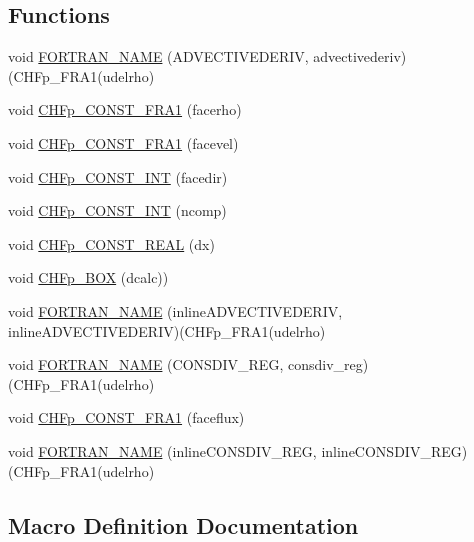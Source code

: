 \subsection*{Functions}
\begin{DoxyCompactItemize}
\item 
void \hyperlink{cdr__solverF__F_8H_a6eee6b82c47317a482ecaaf9adedaf5f}{F\+O\+R\+T\+R\+A\+N\+\_\+\+N\+A\+ME} (A\+D\+V\+E\+C\+T\+I\+V\+E\+D\+E\+R\+IV, advectivederiv)(C\+H\+Fp\+\_\+\+F\+R\+A1(udelrho)
\item 
void \hyperlink{cdr__solverF__F_8H_aed6771007b9e1bee1ab1c05052840f0c}{C\+H\+Fp\+\_\+\+C\+O\+N\+S\+T\+\_\+\+F\+R\+A1} (facerho)
\item 
void \hyperlink{cdr__solverF__F_8H_a318274d3849ac8a171a91e4015a86b8f}{C\+H\+Fp\+\_\+\+C\+O\+N\+S\+T\+\_\+\+F\+R\+A1} (facevel)
\item 
void \hyperlink{cdr__solverF__F_8H_ae815582b84a8a494b7fcb6adbcb99eac}{C\+H\+Fp\+\_\+\+C\+O\+N\+S\+T\+\_\+\+I\+NT} (facedir)
\item 
void \hyperlink{cdr__solverF__F_8H_af5e2bb529292ffeee778ec16883ab173}{C\+H\+Fp\+\_\+\+C\+O\+N\+S\+T\+\_\+\+I\+NT} (ncomp)
\item 
void \hyperlink{cdr__solverF__F_8H_aab9e0951392a8388d9b94d058e47a98c}{C\+H\+Fp\+\_\+\+C\+O\+N\+S\+T\+\_\+\+R\+E\+AL} (dx)
\item 
void \hyperlink{cdr__solverF__F_8H_a72ca9a76864b425a8bc56c7b7d4e1f01}{C\+H\+Fp\+\_\+\+B\+OX} (dcalc))
\item 
void \hyperlink{cdr__solverF__F_8H_a382568d0ec3df87a8c3883f57f21c538}{F\+O\+R\+T\+R\+A\+N\+\_\+\+N\+A\+ME} (inline\+A\+D\+V\+E\+C\+T\+I\+V\+E\+D\+E\+R\+IV, inline\+A\+D\+V\+E\+C\+T\+I\+V\+E\+D\+E\+R\+IV)(C\+H\+Fp\+\_\+\+F\+R\+A1(udelrho)
\item 
void \hyperlink{cdr__solverF__F_8H_a7197fedef56dffd90a10bb95bfa96502}{F\+O\+R\+T\+R\+A\+N\+\_\+\+N\+A\+ME} (C\+O\+N\+S\+D\+I\+V\+\_\+\+R\+EG, consdiv\+\_\+reg)(C\+H\+Fp\+\_\+\+F\+R\+A1(udelrho)
\item 
void \hyperlink{cdr__solverF__F_8H_afe313ded8fbb1be2053e03850522ca3c}{C\+H\+Fp\+\_\+\+C\+O\+N\+S\+T\+\_\+\+F\+R\+A1} (faceflux)
\item 
void \hyperlink{cdr__solverF__F_8H_afe590fe98bbd9490452f10e795b91052}{F\+O\+R\+T\+R\+A\+N\+\_\+\+N\+A\+ME} (inline\+C\+O\+N\+S\+D\+I\+V\+\_\+\+R\+EG, inline\+C\+O\+N\+S\+D\+I\+V\+\_\+\+R\+EG)(C\+H\+Fp\+\_\+\+F\+R\+A1(udelrho)
\end{DoxyCompactItemize}


\subsection{Macro Definition Documentation}
